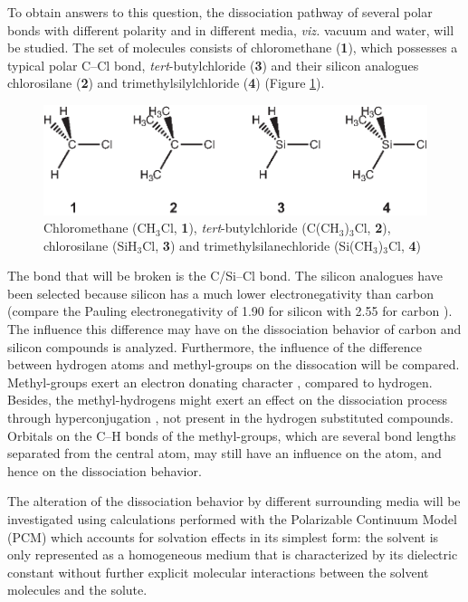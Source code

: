 To obtain answers to this question, the dissociation pathway of several polar bonds with different polarity and in different media, \textit{viz.} vacuum and water, will be studied.  The set of molecules consists of chloromethane (\textbf{1}), which possesses a typical polar C--Cl bond, \textit{tert}-butylchloride (\textbf{3}) and their silicon analogues chlorosilane (\textbf{2}) and trimethylsilylchloride (\textbf{4}) (Figure \ref{ch3.fig.compounds}).  
\begin{figure}[htbp]
\begin{center}
\includegraphics{dissociation/figures/compounds.eps}
\end{center}
\caption{Chloromethane (CH$_3$Cl, \textbf{1}), \textit{tert}-butylchloride
(C(CH$_3$)$_3$Cl, \textbf{2}), chlorosilane (SiH$_3$Cl, \textbf{3}) and trimethylsilanechloride
(Si(CH$_3$)$_3$Cl, \textbf{4})}
\label{ch3.fig.compounds}
\end{figure} 
The bond that will be broken is the C/Si--Cl bond.  The silicon analogues have been selected because silicon has a much lower electronegativity than carbon (compare the Pauling electronegativity of 1.90 for silicon with 2.55 for carbon \cite{handbook}). The influence this difference may have on the dissociation behavior of carbon and silicon compounds is analyzed. Furthermore, the influence of the difference between hydrogen atoms and methyl-groups on the dissocation will be compared. Methyl-groups exert an electron donating character \cite{mcmurry}, compared to hydrogen. Besides, the methyl-hydrogens might exert an effect on the dissociation process through hyperconjugation \cite{march}, not present in the hydrogen substituted compounds. Orbitals on the C--H bonds of the methyl-groups, which are several bond lengths separated from the central atom, may still have an influence on the atom, and hence on the dissociation behavior. 

The alteration of the dissociation behavior by different surrounding media will be investigated using calculations performed with the Polarizable Continuum Model (PCM) \cite{pcm1,pcm2} which accounts for solvation effects in its simplest form: the solvent is only represented as a homogeneous medium that is characterized by its dielectric constant without further explicit molecular interactions between the solvent molecules and the solute. 

